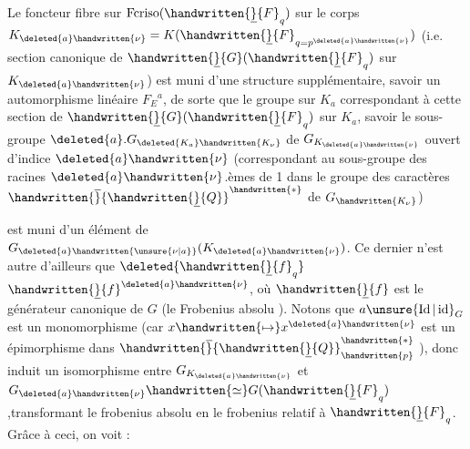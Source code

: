 Le foncteur fibre  sur $\operatorname{Fcriso}(\handwritten{\underline}{F}_q)$  sur le corps $K_{\deleted{a}\handwritten{\nu}}=K(\handwritten{\underline}{F}_{q=p^{\deleted{a}\handwritten{\nu}}})$ 
(i.e. section canonique de $\handwritten{\underline}{G}(\handwritten{\underline}{F}_q)$ sur $K_{\deleted{a}\handwritten{\nu}}$) est muni d'une structure supplémentaire, savoir un automorphisme linéaire $F_E{}^a$, de sorte que le groupe  sur  $K_a$ correspondant à cette section de $\handwritten{\underline}{G}(\handwritten{\underline}{F}_q)$ sur $K_a$, savoir le sous-groupe $\deleted{a}.G_{\deleted{K_a}\handwritten{K_\nu}}$ de $G_{K_{\deleted{a}\handwritten{\nu}}}$ ouvert d'indice $\deleted{a}\handwritten{\nu}$ (correspondant au sous-groupe des racines $\deleted{a}\handwritten{\nu}$.èmes de 1 dans le groupe des caractères $\handwritten{\overline}{\handwritten{\underline}{Q}}^{\handwritten{*}}$ de $G_{\handwritten{K_\nu}}$)

est muni d'un élément  de $G_{\deleted{a}\handwritten{\unsure{\nu|a}}}(K_{\deleted{a}\handwritten{\nu}})$. Ce dernier n'est autre d'ailleurs que $\deleted{\handwritten{\underline}{f}_q}$ $\handwritten{\underline}{f}^{\deleted{a}\handwritten{\nu}}$, où $\handwritten{\underline}{f}$ est le générateur canonique de $G$ (le Frobenius absolu \handwritten{!}).  Notons que $a\unsure{\operatorname{Id}|\operatorname{id}}_G$ est un monomorphisme (car $x\handwritten{\mapsto}x^{\deleted{a}\handwritten{\nu}}$ est un épimorphisme dans $\handwritten{\overline}{\handwritten{\underline}{Q}}_{\handwritten{p}}^{\handwritten{*}}$ ), donc induit un isomorphisme entre $G_{K_{\deleted{a}\handwritten{\nu}}}$ et $G_{\deleted{a}\handwritten{\nu}}\handwritten{\simeq}G(\handwritten{\underline}{F}_q)$,transformant le frobenius  absolu en le frobenius relatif à $\handwritten{\underline}{F}_q$. Grâce à ceci, on voit :

